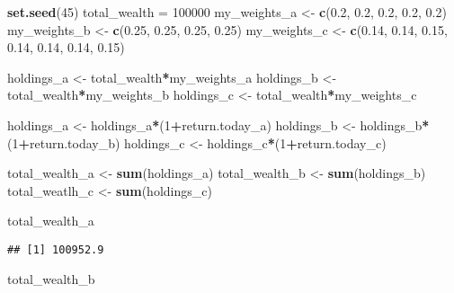 \documentclass[]{article}
\newenvironment{Shaded}{\begin{snugshade}}{\end{snugshade}}
\newcommand{\DecValTok}[1]{\textcolor[rgb]{0.00,0.00,0.81}{#1}}
\newcommand{\FloatTok}[1]{\textcolor[rgb]{0.00,0.00,0.81}{#1}}
\newcommand{\KeywordTok}[1]{\textcolor[rgb]{0.13,0.29,0.53}{\textbf{#1}}}
\newcommand{\NormalTok}[1]{#1}
\newcommand{\OperatorTok}[1]{\textcolor[rgb]{0.81,0.36,0.00}{\textbf{#1}}}
\newcommand{\StringTok}[1]{\textcolor[rgb]{0.31,0.60,0.02}{#1}}
\begin{document}
\begin{Shaded}
\begin{Highlighting}[]
\KeywordTok{set.seed}\NormalTok{(}\DecValTok{45}\NormalTok{)}
\NormalTok{total_wealth =}\StringTok{ }\DecValTok{100000}
\NormalTok{my_weights_a <-}\StringTok{ }\KeywordTok{c}\NormalTok{(}\FloatTok{0.2}\NormalTok{, }\FloatTok{0.2}\NormalTok{, }\FloatTok{0.2}\NormalTok{, }\FloatTok{0.2}\NormalTok{, }\FloatTok{0.2}\NormalTok{)}
\NormalTok{my_weights_b <-}\StringTok{ }\KeywordTok{c}\NormalTok{(}\FloatTok{0.25}\NormalTok{, }\FloatTok{0.25}\NormalTok{, }\FloatTok{0.25}\NormalTok{, }\FloatTok{0.25}\NormalTok{)}
\NormalTok{my_weights_c <-}\StringTok{ }\KeywordTok{c}\NormalTok{(}\FloatTok{0.14}\NormalTok{, }\FloatTok{0.14}\NormalTok{, }\FloatTok{0.15}\NormalTok{, }\FloatTok{0.14}\NormalTok{, }\FloatTok{0.14}\NormalTok{, }\FloatTok{0.14}\NormalTok{, }\FloatTok{0.15}\NormalTok{)}

\NormalTok{holdings_a <-}\StringTok{ }\NormalTok{total_wealth}\OperatorTok{*}\NormalTok{my_weights_a}
\NormalTok{holdings_b <-}\StringTok{ }\NormalTok{total_wealth}\OperatorTok{*}\NormalTok{my_weights_b}
\NormalTok{holdings_c <-}\StringTok{ }\NormalTok{total_wealth}\OperatorTok{*}\NormalTok{my_weights_c}

\NormalTok{holdings_a <-}\StringTok{ }\NormalTok{holdings_a}\OperatorTok{*}\NormalTok{(}\DecValTok{1}\OperatorTok{+}\NormalTok{return.today_a)}
\NormalTok{holdings_b <-}\StringTok{ }\NormalTok{holdings_b}\OperatorTok{*}\NormalTok{(}\DecValTok{1}\OperatorTok{+}\NormalTok{return.today_b)}
\NormalTok{holdings_c <-}\StringTok{ }\NormalTok{holdings_c}\OperatorTok{*}\NormalTok{(}\DecValTok{1}\OperatorTok{+}\NormalTok{return.today_c)}

\NormalTok{total_wealth_a <-}\StringTok{ }\KeywordTok{sum}\NormalTok{(holdings_a)}
\NormalTok{total_wealth_b <-}\StringTok{ }\KeywordTok{sum}\NormalTok{(holdings_b)}
\NormalTok{total_weatlh_c <-}\StringTok{ }\KeywordTok{sum}\NormalTok{(holdings_c)}

\NormalTok{total_wealth_a}
\end{Highlighting}
\end{Shaded}

\begin{verbatim}
## [1] 100952.9
\end{verbatim}

\begin{Shaded}
\begin{Highlighting}[]
\NormalTok{total_wealth_b}
\end{Highlighting}
\end{Shaded}
\end{document}
